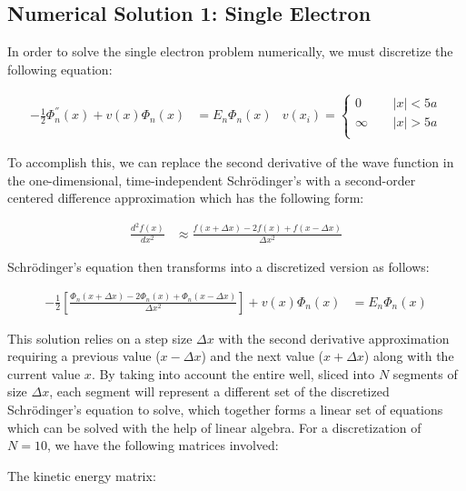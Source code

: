 \documentclass[10pt, oneside, letterpaper]{article}
\begin{document}
\subsection{Numerical Solution 1: Single Electron}

In order to solve the single electron problem numerically, we must discretize the following equation:

\begin{align*}
  -\frac{1}{2}\Phi^{''}_n(x) + v(x)\Phi_n(x) &= {E_n}\Phi_n(x)
  & v(x_i) = \begin{cases}
          0       \quad \, & |x| < 5a \\
          \infty  \quad \, & |x| > 5a \\
     \end{cases}
\end{align*}

To accomplish this, we can replace the second derivative of the wave function in the one-dimensional, time-independent Schr\"{o}dinger's with a second-order centered difference approximation which has the following form:

\begin{align*}
  \frac{d^2f(x)}{dx^2} &\approx \frac{f(x + \Delta x) - 2f(x) + f(x - \Delta x)}{\Delta x^2}
\end{align*}

Schr\"{o}dinger's equation then transforms into a discretized version as follows:

\begin{align*}
  -\frac{1}{2}\left[\frac{\Phi_n(x + \Delta x) - 2\Phi_n(x) + \Phi_n(x - \Delta x)}{\Delta x^2}\right] + v(x)\Phi_n(x) &= {E_n}\Phi_n(x)
\end{align*}

This solution relies on a step size $\Delta x$ with the second derivative approximation requiring a previous value ($x - \Delta x$) and the next value ($x + \Delta x$) along with the current value $x$. By taking into account the entire well, sliced into $N$ segments of size $\Delta x$, each segment will represent a different set of the discretized Schr\"{o}dinger's equation to solve, which together forms a linear set of equations which can be solved with the help of linear algebra. For a discretization of $N=10$, we have the following matrices involved:

The kinetic energy matrix:
\end{document}
